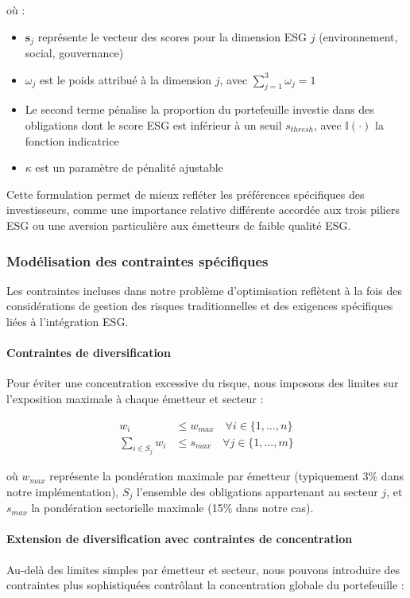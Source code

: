 où :
\begin{itemize}
    \item $\mathbf{s}_{j}$ représente le vecteur des scores pour la dimension ESG $j$ (environnement, social, gouvernance)
    \item $\omega_j$ est le poids attribué à la dimension $j$, avec $\sum_{j=1}^{3} \omega_j = 1$
    \item Le second terme pénalise la proportion du portefeuille investie dans des obligations dont le score ESG est inférieur à un seuil $s_{thresh}$, avec $\mathbb{I}(\cdot)$ la fonction indicatrice
    \item $\kappa$ est un paramètre de pénalité ajustable
\end{itemize}

Cette formulation permet de mieux refléter les préférences spécifiques des investisseurs, comme une importance relative différente accordée aux trois piliers ESG ou une aversion particulière aux émetteurs de faible qualité ESG.

\subsubsection{Modélisation des contraintes spécifiques}

Les contraintes incluses dans notre problème d'optimisation reflètent à la fois des considérations de gestion des risques traditionnelles et des exigences spécifiques liées à l'intégration ESG.

\paragraph{Contraintes de diversification} 
Pour éviter une concentration excessive du risque, nous imposons des limites sur l'exposition maximale à chaque émetteur et secteur :

\begin{align}
w_i &\leq w_{max} \quad \forall i \in \{1, \ldots, n\} \\
\sum_{i \in S_j} w_i &\leq s_{max} \quad \forall j \in \{1, \ldots, m\}
\end{align}

où $w_{max}$ représente la pondération maximale par émetteur (typiquement 3\% dans notre implémentation), $S_j$ l'ensemble des obligations appartenant au secteur $j$, et $s_{max}$ la pondération sectorielle maximale (15\% dans notre cas).

\paragraph{Extension de diversification avec contraintes de concentration}
Au-delà des limites simples par émetteur et secteur, nous pouvons introduire des contraintes plus sophistiquées contrôlant la concentration globale du portefeuille :

